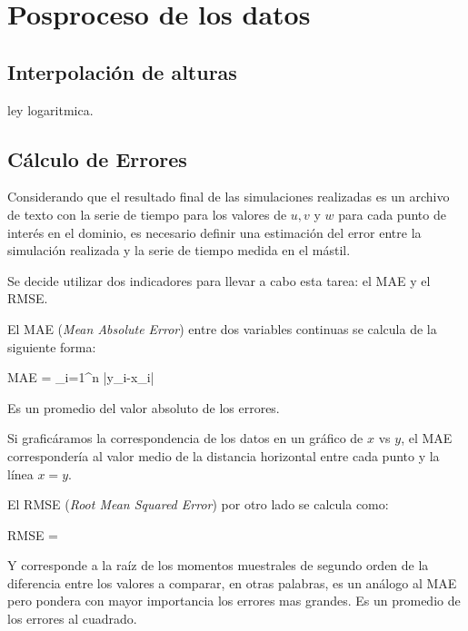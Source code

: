 \begin{table}[H]
	\caption{Detalle de la asimilación en cada mástil en Bolund.}\label{tab:05_mast_da_bol}
	\centering\footnotesize{}
\end{table}

\section{Posproceso de los datos}
\subsection{Interpolación de alturas}
ley logaritmica.
\subsection{Cálculo de Errores}
Considerando que el resultado final de las simulaciones realizadas es un archivo de texto con la serie de tiempo para los valores de $u,v$ y $w$ para cada punto de interés en el dominio, es necesario definir una estimación del error entre la simulación realizada y la serie de tiempo medida en el mástil.

Se decide utilizar dos indicadores para llevar a cabo esta tarea: el MAE y el RMSE.

El MAE (\emph{Mean Absolute Error}) entre dos variables continuas se calcula de la siguiente forma:

\be 
MAE = \sum_{i=1}^n |y_i-x_i|
\ee

Es un promedio del valor absoluto de los errores.

Si graficáramos la correspondencia de los datos en un gráfico de $x$ vs $y$, el MAE correspondería al valor medio de la distancia horizontal entre cada punto y la línea $x=y$.

El RMSE (\emph{Root Mean Squared Error}) por otro lado se calcula como:

\be 
RMSE = 
\ee

Y corresponde a la raíz de los momentos muestrales de segundo orden de la diferencia entre los valores a comparar, en otras palabras, es un análogo al MAE pero pondera con mayor importancia los errores mas grandes. Es un promedio de los errores al cuadrado.